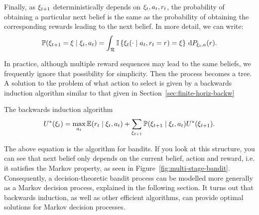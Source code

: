 \begin{definition}
  Finally, as $\xi_{t+1}$ deterministically depends on $\xi_t, a_t, r_t$, the probability of obtaining a particular next belief is the same as the probability of obtaining the corresponding rewards leading to the next belief. In more detail, we can write:
  \begin{equation}
    \label{eq:dt-bandit-belief-probability}
    \mathop{\mbox{\ensuremath{\mathbb{P}}}}\nolimits(\xi_{t+1} = \xi \mid \xi_t, a_t)
    =
    \int_{\mathcal{R}} \mathop{\mbox{\ensuremath{\mathbb{I}}}}\left\{\xi_{t}(\cdot \mid a_t, r_t = r) = \xi\right\} \,\mathrm{d}{P_{\xi_t, a}}(r). 
  \end{equation}
\end{definition}
In practice, although multiple reward sequences may lead to the same beliefs, we frequently ignore that possibility for simplicity. Then the process becomes a tree. A solution to the problem of what action to select is given by a backwards induction algorithm similar to that given in Section~\ref{sec:finite-horiz-backw}
\begin{block}{The backwards induction algorithm}
\begin{equation}
  U^*(\xi_t) = \max_{a_t} \mathop{\mbox{\ensuremath{\mathbb{E}}}}\nolimits(r_t \mid \xi_t, a_t) + \sum_{\xi_{t+1}} \mathop{\mbox{\ensuremath{\mathbb{P}}}}\nolimits(\xi_{t+1} \mid \xi_t, a_t) U^*(\xi_{t+1}).\label{eq:backwards-induction-bandits}
\end{equation}
\end{block}
The above equation is the  algorithm for bandits.  If you look at this structure, you can see that  next belief only depends on the current belief, action and reward, i.e. it satisfies the Markov property, as seen in Figure~\ref{fig:multi-stage-bandit}. Consequently, a decision-theoretic bandit process can be modelled more generally as a Markov decision process, explained in the following section. It turns out that backwards induction, as well as other efficient algorithms, can provide optimal solutions for Markov decision processes.
